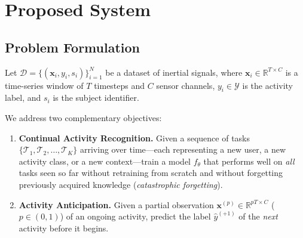 %

\chapter{Proposed System}

\section{Problem Formulation}

Let $\mathcal{D} = \{(\mathbf{x}_i, y_i, s_i)\}_{i=1}^{N}$ be a dataset of
inertial signals, where $\mathbf{x}_i \in \mathbb{R}^{T \times C}$ is a
time-series window of $T$ timesteps and $C$ sensor channels,
$y_i \in \mathcal{Y}$ is the activity label, and $s_i$ is the subject
identifier.

We address two complementary objectives:

\begin{enumerate}
    \item \textbf{Continual Activity Recognition.}
    Given a sequence of tasks $\{\mathcal{T}_1, \mathcal{T}_2, \ldots,
    \mathcal{T}_K\}$ arriving over time---each representing a new user,
    a new activity class, or a new context---train a model $f_\theta$ that
    performs well on \emph{all} tasks seen so far without retraining from
    scratch and without forgetting previously acquired knowledge
    (\emph{catastrophic forgetting}).

    \item \textbf{Activity Anticipation.}
    Given a partial observation $\mathbf{x}^{(p)} \in \mathbb{R}^{pT \times C}$
    ($p \in (0,1)$) of an ongoing activity, predict the label
    $\hat{y}^{(+1)}$ of the \emph{next} activity before it begins.
\end{enumerate}


